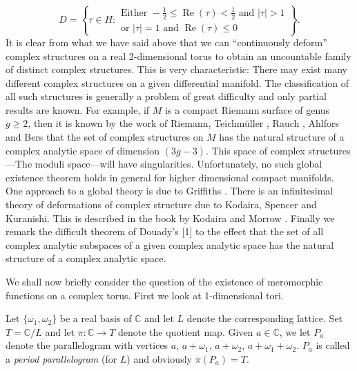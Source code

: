 \begin{center}
    \begin{minipage}{\linewidth}
        \centering
        
    \end{minipage}
\end{center}
\[
D=\left\{\tau\in H:\begin{array}{l}
\text{Either }-\tfrac12\leq\operatorname{Re}(\tau)<\tfrac12\text{ and }|\tau|>1\\
\text{or }|\tau|=1\text{ and }\operatorname{Re}(\tau)\leq0
\end{array}\right\}.
\]
It is clear from what we have said above that we can ``continuously deform'' complex structures on a real 2-dimensional torus to obtain an uncountable family of distinct complex structures. This is very characteristic: There may exist many different complex structures on a given differential manifold. The classification of all such structures is generally a problem of great difficulty and only partial results are known. For example, if $M$ is a compact Riemann surface of genus $g\geq2$, then it is known by the work of Riemann, Teichm\"uller \cite{bib:I:teichmuller-o:1}, Rauch \cite{bib:I:rauch-h-e:1}, Ahlfors \cite{bib:I:ahlfors-l-v:2} and Bers \cite{bib:I:bers-l:1} that the set of complex structures on $M$ has the natural structure of a complex analytic space of dimension $(3g-3)$. This space of complex structures---The moduli space---will have singularities. Unfortunately, no such global existence theorem holds in general for higher dimensional compact manifolds. One approach to a global theory is due to Griffiths \cite{bib:I:griffiths-p:1}. There is an infinitesimal theory of deformations of complex structure due to Kodaira, Spencer and Kuranishi. This is described in the book by Kodaira and Morrow \cite{bib:I:kodaira-k-and-morrow-j:1}. Finally we remark the difficult theorem of Douady's [1] to the effect that the set of all
complex analytic subspaces of a given complex analytic space has the natural structure of a complex analytic space.

We shall now briefly consider the question of the existence of meromorphic functions on a complex torus. First we look at 1-dimensional tori.

Let $\{\omega_1,\omega_2\}$ be a real basis of $\mathbb C$ and let $L$ denote the corresponding lattice. Set $T=\mathbb C/L$ and let $\pi:\mathbb C\longrightarrow T$ denote the quotient map. Given $a\in\mathbb C$, we let $P_a$ denote the parallelogram with vertices $a$, $a+\omega_1$, $a+\omega_2$, $a+\omega_1+\omega_2$. $P_a$ is called a \emph{period parallelogram} (for $L$) and obviously $\pi(P_a)=T$.

